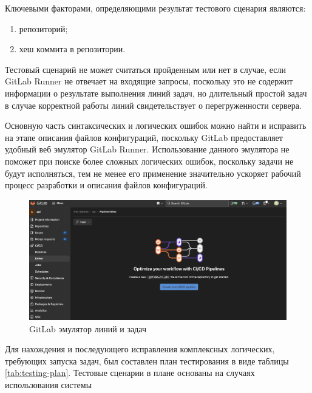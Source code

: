 Ключевыми факторами, определяющими результат тестового сценария являются:
\begin{enumerate}
    \item репозиторий;
    \item хеш коммита в репозитории.
\end{enumerate}

Тестовый сценарий не может считаться пройденным или нет в случае, если GitLab Runner не отвечает на входящие запросы, поскольку это не содержит информации о результате выполнения линий задач,
но длительный простой задач в случае корректной работы линий свидетельствует о перегруженности сервера.

Основную часть синтаксических и логических ошибок можно найти и исправить на этапе описания файлов конфигураций, поскольку GitLab предоставляет удобный веб эмулятор GitLab Runner.
Использование данного эмулятора не поможет при поиске более сложных логических ошибок, поскольку задачи не будут исполняться, тем не менее его применение значительно ускоряет рабочий процесс разработки и описания файлов конфигураций.

\begin{figure}[ht]
    \centering
    \includegraphics[scale=0.33]{src/figures/gitlab-editor}
    \caption{GitLab эмулятор линий и задач}
    \label{fig:gitlab-editor}
\end{figure}

Для нахождения и последующего исправления комплексных логических, требующих запуска задач, был составлен план тестирования в виде таблицы \ref{tab:testing-plan}.
Тестовые сценарии в плане основаны на случаях использования системы

